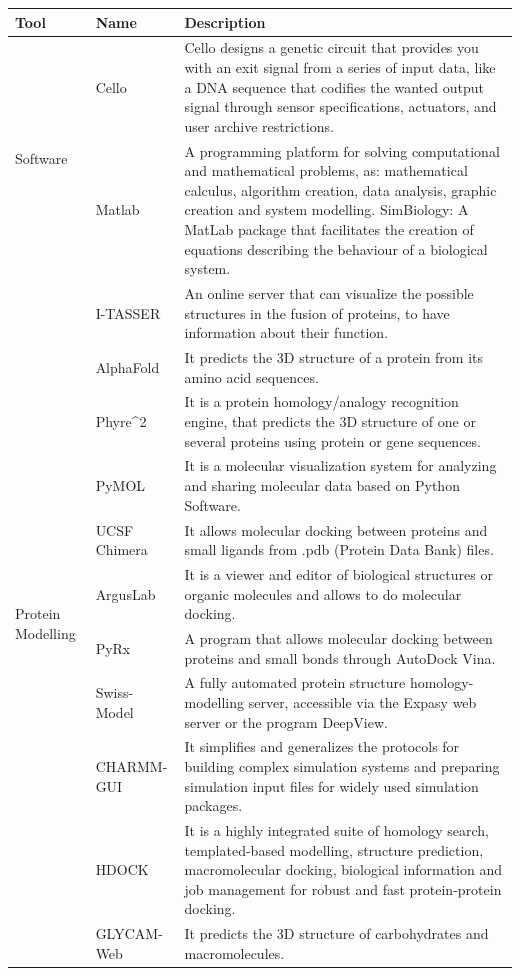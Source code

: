 \documentclass[11pt, letterpaper, english]{article}
\begin{document}
\begin{table}[]
\begin{tabular}{ | m{3cm} | m{4cm}| m{9.2cm} | } 
\hline
Tool &
  Name &
  Description \\ \hline
\multirow{2}{*}{Software} &
  Cello &
Cello designs a genetic circuit that provides you with an exit signal from a series of input data, like a DNA sequence that codifies the wanted output signal through sensor specifications, actuators,  and user archive restrictions. \\ \cline{2-3} 
 &
  Matlab &
  A programming platform for solving computational and mathematical problems, as: mathematical calculus, algorithm creation, data analysis,  graphic creation and system modelling.  SimBiology: A MatLab package that facilitates the creation of equations describing the behaviour of a biological system. \\ \hline
\multirow{11}{*}{Protein Modelling} &
  I-TASSER &
  An online server that can visualize the possible structures in the fusion of proteins, to have information about their function. \\ \cline{2-3} 
 &
  AlphaFold &
  It predicts the 3D structure of a protein from its amino acid sequences. \\ \cline{2-3} 
 &
  Phyre\textasciicircum{}2 &
  It is a protein homology/analogy recognition engine, that predicts the 3D structure of one or several proteins using protein or gene sequences.\\ \cline{2-3} 
 &
  PyMOL &
  It is a molecular visualization system for analyzing and sharing molecular data based on Python Software.\\ \cline{2-3} 
 &
  UCSF Chimera &
  It allows molecular docking between proteins and small ligands from .pdb (Protein Data Bank) files. \\ \cline{2-3} 
 &
  ArgusLab &
  It is a viewer and editor of biological structures or organic molecules and allows to do molecular docking.\\ \cline{2-3} 
 &
  PyRx &
  A program that allows molecular docking between proteins and small bonds through AutoDock Vina.\\ \cline{2-3} 
 &
  Swiss-Model &
  A fully automated protein structure homology-modelling server, accessible via the Expasy web server or the program DeepView. \\ \cline{2-3} 
 &
  CHARMM-GUI &
  It simplifies and generalizes the protocols for building complex simulation systems and preparing simulation input files for widely used simulation packages. \\ \cline{2-3} 
 &
  HDOCK &
  It is a highly integrated suite of homology search, templated-based modelling, structure prediction, macromolecular docking, biological  information and job management for robust and fast protein-protein  docking. \\ \cline{2-3} 
 &
  GLYCAM-Web &
  It predicts the 3D structure of carbohydrates and macromolecules. \\ \hline
\end{tabular}
\end{table}
\end{document}
